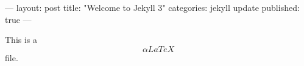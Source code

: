 ---
layout: post
title:  "Welcome to Jekyll 3"
categories: jekyll update
published: true
---


This is a $$\alpha{LaTeX}$$ file.